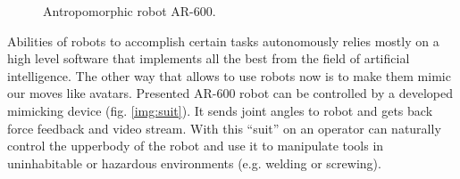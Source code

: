 \documentclass[letterpaper, 10 pt, conference]{ieeeconf}  %
\begin{document}
\begin{figure} [thpb]
      \centering
      \caption{Antropomorphic robot AR-600.}
      \label{img:ar600}
\end{figure}


Abilities of robots to accomplish certain tasks autonomously relies mostly on
a high level software that implements all the best from the field of artificial
intelligence. The other way that allows to use robots now is to make them mimic
our moves like avatars. Presented AR-600 robot can be controlled by a developed
mimicking device (fig. \ref{img:suit}). It sends joint angles to robot and
gets back force feedback and video stream. With this ``suit'' on an
operator can naturally control the upperbody of the robot and use it to manipulate tools in uninhabitable or hazardous environments (e.g. welding or screwing).
\end{document}
